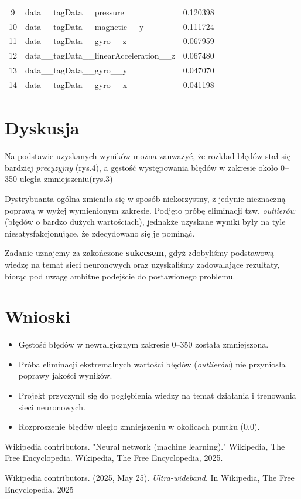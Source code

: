 \documentclass{classrep}
\begin{document}
{\begin{table}[ht]
\begin{tabular}{|c|l|r|}
		  9           & data\_\_tagData\_\_pressure                & 0.120398      \\
		  10          & data\_\_tagData\_\_magnetic\_\_y           & 0.111724      \\
		  11          & data\_\_tagData\_\_gyro\_\_z               & 0.067959      \\
		  12          & data\_\_tagData\_\_linearAcceleration\_\_z & 0.067480      \\
		  13          & data\_\_tagData\_\_gyro\_\_y               & 0.047070      \\
		  14          & data\_\_tagData\_\_gyro\_\_x               & 0.041198      \\
		  \hline
	  \end{tabular}
	  \label{tab:nn_weights}
  \end{table}
 }
\clearpage{}

\section{Dyskusja}

Na podstawie uzyskanych wyników można zauważyć, że rozkład błędów stał się bardziej \textit{precyzyjny} (rys.4), a gęstość występowania błędów w zakresie około 0–350 uległa zmniejszeniu(rys.3)

Dystrybuanta ogólna zmieniła się w sposób niekorzystny, z jedynie nieznaczną poprawą w wyżej wymienionym zakresie. Podjęto próbę eliminacji tzw. \textit{outlierów} (błędów o bardzo dużych wartościach), jednakże uzyskane wyniki były na tyle niesatysfakcjonujące, że zdecydowano się je pominąć.

Zadanie uznajemy za zakończone \textbf{sukcesem}, gdyż zdobyliśmy podstawową wiedzę na temat sieci neuronowych oraz uzyskaliśmy zadowalające rezultaty, biorąc pod uwagę ambitne podejście do postawionego problemu.

\section{Wnioski}

\begin{itemize}
	\item Gęstość błędów w newralgicznym zakresie 0–350 została zmniejszona.
	\item Próba eliminacji ekstremalnych wartości błędów (\textit{outlierów}) nie przyniosła poprawy jakości wyników.
	\item Projekt przyczynił się do pogłębienia wiedzy na temat działania i trenowania sieci neuronowych.
	\item Rozproszenie błędów uległo zmniejszeniu w okolicach puntku (0,0).
\end{itemize}

\begin{thebibliography}{0}
	 Wikipedia contributors. "Neural network (machine learning)."
	Wikipedia, The Free Encyclopedia. Wikipedia, The Free Encyclopedia,
	2025.

	 Wikipedia contributors. (2025, May 25). \textit{Ultra-wideband}.
	In Wikipedia, The Free Encyclopedia. 2025

\end{thebibliography}
\end{document}
